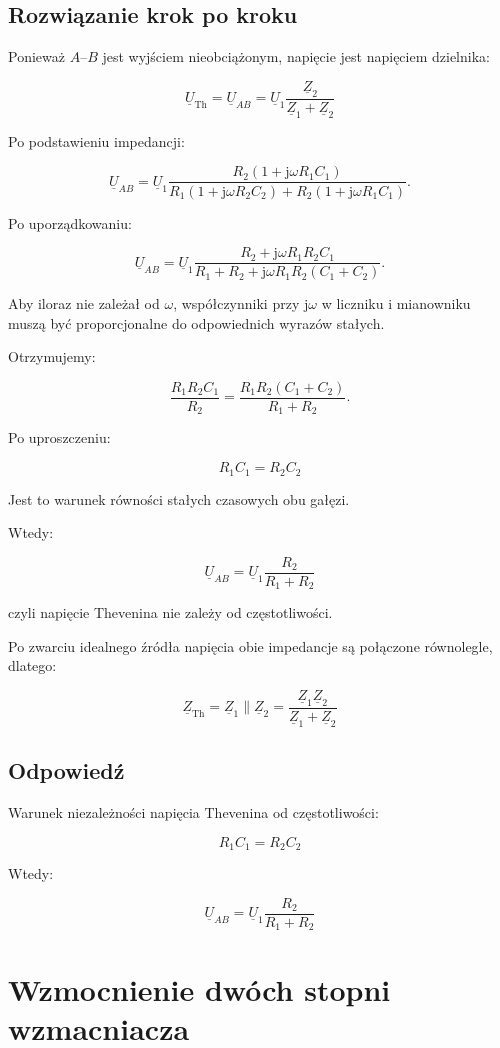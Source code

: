\documentclass[12pt,a4paper]{article}
\newcommand{\jw}{\mathrm{j}\omega}
\newcommand{\Z}{\underline{Z}}
\newcommand{\U}{\underline{U}}
\begin{document}
\subsection*{Rozwiązanie krok po kroku}

Ponieważ $A$--$B$ jest wyjściem nieobciążonym,
napięcie jest napięciem dzielnika:

\[
\boxed{
\U_{\mathrm{Th}}=
\U_{AB}
=
\U_1\frac{\Z_2}{\Z_1+\Z_2}
}
\]

Po podstawieniu impedancji:

\[
\U_{AB}
=
\U_1
\frac{R_2(1+\jw R_1C_1)}
{R_1(1+\jw R_2C_2)+R_2(1+\jw R_1C_1)}.
\]

Po uporządkowaniu:

\[
\U_{AB}
=
\U_1
\frac{R_2+\jw R_1R_2C_1}
{R_1+R_2+\jw R_1R_2(C_1+C_2)}.
\]

Aby iloraz nie zależał od $\omega$,
współczynniki przy $\jw$ w liczniku i mianowniku muszą
być proporcjonalne do odpowiednich wyrazów stałych.

Otrzymujemy:

\[
\frac{R_1R_2C_1}{R_2}
=
\frac{R_1R_2(C_1+C_2)}{R_1+R_2}.
\]

Po uproszczeniu:

\[
\boxed{R_1C_1=R_2C_2}
\]

Jest to warunek równości stałych czasowych obu gałęzi.

Wtedy:

\[
\boxed{
\U_{AB}=
\U_1\frac{R_2}{R_1+R_2}
}
\]

czyli napięcie Thevenina nie zależy od częstotliwości.

Po zwarciu idealnego źródła napięcia obie impedancje
są połączone równolegle, dlatego:

\[
\boxed{
\Z_{\mathrm{Th}}=
\Z_1\parallel\Z_2
=
\frac{\Z_1\Z_2}{\Z_1+\Z_2}
}
\]

\subsection*{Odpowiedź}

Warunek niezależności napięcia Thevenina od częstotliwości:

\[
\boxed{R_1C_1=R_2C_2}
\]

Wtedy:

\[
\boxed{
\U_{AB}=
\U_1\frac{R_2}{R_1+R_2}
}
\]

\newpage

\section{Wzmocnienie dwóch stopni wzmacniacza}
\end{document}
